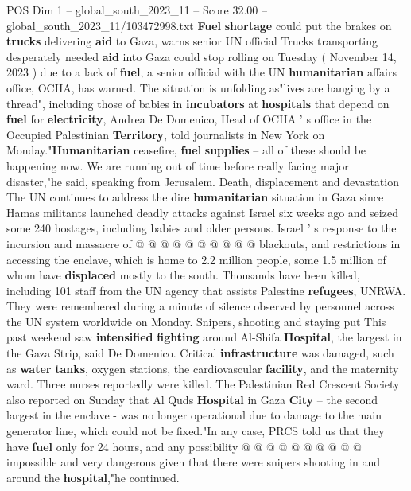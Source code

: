 \begin{textsample}{POS Dim 1 – global\_south\_2023\_11 – Score 32.00 – global\_south\_2023\_11/103472998.txt}  \label{ex:f1_pos_127}
\textbf{Fuel} \textbf{shortage} could put the brakes on \textbf{trucks} delivering \textbf{aid} to Gaza, warns senior UN official Trucks transporting desperately needed \textbf{aid} into Gaza could stop rolling on Tuesday ( November 14, 2023 ) due to a lack of \textbf{fuel}, a senior official with the UN \textbf{humanitarian} affairs office, OCHA, has warned.
The situation is unfolding as"lives are hanging by a thread", including those of babies in \textbf{incubators} at \textbf{hospitals} that depend on \textbf{fuel} for \textbf{electricity}, Andrea De Domenico, Head of OCHA ' s office in the Occupied Palestinian \textbf{Territory}, told journalists in New York on Monday."\textbf{Humanitarian} ceasefire, \textbf{fuel} \textbf{supplies} -- all of these should be happening now.
We are running out of time before really facing major disaster,"he said, speaking from Jerusalem.
Death, displacement and devastation The UN continues to address the dire \textbf{humanitarian} situation in Gaza since Hamas militants launched deadly attacks against Israel six weeks ago and seized some 240 hostages, including babies and older persons.
Israel ' s response to the incursion and massacre of @ @ @ @ @ @ @ @ @ @ blackouts, and restrictions in accessing the enclave, which is home to 2.2 million people, some 1.5 million of whom have \textbf{displaced} mostly to the south.
Thousands have been killed, including 101 staff from the UN agency that assists Palestine \textbf{refugees}, UNRWA.
They were remembered during a minute of silence observed by personnel across the UN system worldwide on Monday.
Snipers, shooting and staying put This past weekend saw \textbf{intensified} \textbf{fighting} around Al-Shifa \textbf{Hospital}, the largest in the Gaza Strip, said De Domenico.
Critical \textbf{infrastructure} was damaged, such as \textbf{water} \textbf{tanks}, oxygen stations, the cardiovascular \textbf{facility}, and the maternity ward.
Three nurses reportedly were killed.
The Palestinian Red Crescent Society also reported on Sunday that Al Quds \textbf{Hospital} in Gaza \textbf{City} -- the second largest in the enclave - was no longer operational due to damage to the main generator line, which could not be fixed."In any case, PRCS told us that they have \textbf{fuel} only for 24 hours, and any possibility @ @ @ @ @ @ @ @ @ @ impossible and very dangerous given that there were snipers shooting in and around the \textbf{hospital},"he continued.

\end{textsample}
